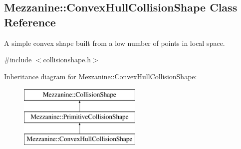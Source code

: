 \hypertarget{classMezzanine_1_1ConvexHullCollisionShape}{
\subsection{Mezzanine::ConvexHullCollisionShape Class Reference}
\label{classMezzanine_1_1ConvexHullCollisionShape}
}


A simple convex shape built from a low number of points in local space.  




{\ttfamily \#include $<$collisionshape.h$>$}

Inheritance diagram for Mezzanine::ConvexHullCollisionShape:\begin{figure}[H]
\begin{center}
\leavevmode
\includegraphics[height=3.000000cm]{classMezzanine_1_1ConvexHullCollisionShape}
\end{center}
\end{figure}
